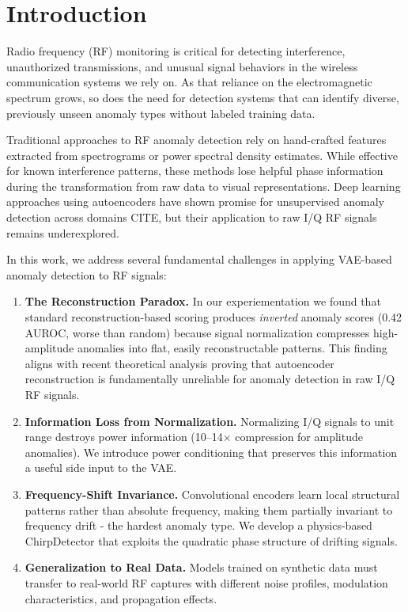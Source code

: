 \documentclass[conference]{IEEEtran}
\begin{document}
\section{Introduction}
Radio frequency (RF) monitoring is critical for detecting interference, unauthorized transmissions, and unusual signal behaviors in the wireless communication systems we rely on. As that reliance on the electromagnetic spectrum grows, so does the need for detection systems that can identify diverse, previously unseen anomaly types without labeled training data. 

Traditional approaches to RF anomaly detection rely on hand-crafted features extracted from spectrograms or power spectral density estimates. While effective for known interference patterns, these methods lose helpful phase information during the transformation from raw data to visual representations. Deep learning approaches using autoencoders have shown promise for unsupervised anomaly detection across domains CITE, but their application to raw I/Q RF signals remains underexplored.

In this work, we address several fundamental challenges in applying VAE-based anomaly detection to RF signals:

\begin{enumerate}
\item \textbf{The Reconstruction Paradox.} In our experiementation we found that standard reconstruction-based scoring produces \emph{inverted} anomaly scores (0.42 AUROC, worse than random) because signal normalization compresses high-amplitude anomalies into flat, easily reconstructable patterns. This finding aligns with recent theoretical analysis proving that autoencoder reconstruction is fundamentally unreliable for anomaly detection in raw I/Q RF signals.~\cite{bouman2025autoencodersanomalydetectionunreliable}
\item \textbf{Information Loss from Normalization.} Normalizing I/Q signals to unit range destroys power information (10--14$\times$ compression for amplitude anomalies). We introduce power conditioning that preserves this information a useful side input to the VAE.
\item \textbf{Frequency-Shift Invariance.} Convolutional encoders learn local structural patterns rather than absolute frequency, making them partially invariant to frequency drift - the hardest anomaly type. We develop a physics-based ChirpDetector that exploits the quadratic phase structure of drifting signals.
\item \textbf{Generalization to Real Data.} Models trained on synthetic data must transfer to real-world RF captures with different noise profiles, modulation characteristics, and propagation effects.
\end{enumerate}
\end{document}
